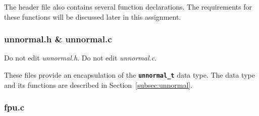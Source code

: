 The header file also contains several function declarations.
The requirements for these functions will be discussed later in this assignment.

\subsubsection{unnormal.h \& unnormal.c}

Do not edit \textit{unnormal.h}.
Do not edit \textit{unnormal.c}.

These files provide an encapsulation of the \textbf{\texttt{unnormal\_t}} data type.
The data type and its functions are described in Section~\ref{subsec:unnormal}.

\subsubsection{fpu.c}

